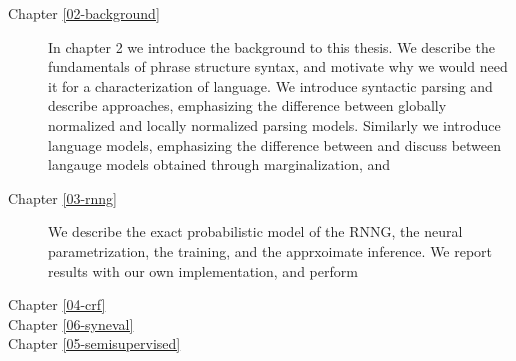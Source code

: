   \begin{description}
    \item[Chapter \ref{02-background}]
      In chapter 2 we introduce the background to this thesis. We describe the fundamentals of phrase structure syntax, and motivate why we would need it for a characterization of language. We introduce syntactic parsing and describe approaches, emphasizing the difference between globally normalized and locally normalized  parsing models. Similarly we introduce language models, emphasizing the difference between and discuss between langauge models obtained through marginalization, and

    \item[Chapter \ref{03-rnng}]
      We describe the exact probabilistic model of the RNNG, the neural parametrization, the training, and the apprxoimate inference. We report results with our own implementation, and perform

    \item[Chapter \ref{04-crf}]

    \item[Chapter \ref{06-syneval}]

    \item[Chapter \ref{05-semisupervised}]

  \end{description}


